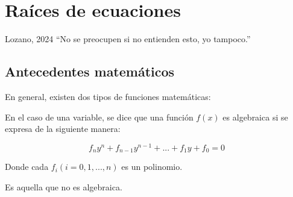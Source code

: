 \chapter{Raíces de ecuaciones}

\begin{chapquote}{Lozano, 2024}
    ``No se preocupen si no entienden esto, yo tampoco.''
\end{chapquote}


\section{Antecedentes matemáticos}

En general, existen dos tipos de funciones matemáticas:

\begin{definition}
	En el caso de una variable, se dice que una función \(f(x)\) es
	algebraica si se expresa de la siguiente manera:

	\[
		f_n y^n + f_{n-1} y^{n-1} + ... + f_1 y + f_0 = 0
	\]

	Donde cada \(f_i (i = 0, 1, ..., n)\) es un polinomio.
\end{definition}

\begin{definition}
	Es aquella que no es algebraica.
\end{definition}
